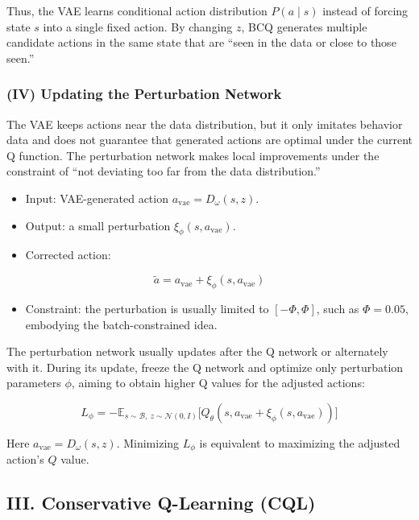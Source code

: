 Thus, the VAE learns conditional action distribution \(P(a\mid s)\) instead of forcing state \(s\) into a single fixed action. By changing \(z\), BCQ generates multiple candidate actions in the same state that are ``seen in the data or close to those seen.''

\hypertarget{iv-updating-the-perturbation-network}{%
\subsubsection{(IV) Updating the Perturbation Network}\label{iv-updating-the-perturbation-network}}

The VAE keeps actions near the data distribution, but it only imitates behavior data and does not guarantee that generated actions are optimal under the current Q function. The perturbation network makes local improvements under the constraint of ``not deviating too far from the data distribution.''

\begin{itemize}
\tightlist
\item
  Input: VAE-generated action \(a_{\mathrm{vae}}=D_\omega(s,z)\).
\item
  Output: a small perturbation \(\xi_\phi(s,a_{\mathrm{vae}})\).
\item
{}
  Corrected action:
\end{itemize}

\[
\tilde a = a_{\mathrm{vae}}+\xi_\phi(s,a_{\mathrm{vae}})
\]

\begin{itemize}
\tightlist
\item
  Constraint: the perturbation is usually limited to \([-\Phi,\Phi]\), such as \(\Phi=0.05\), embodying the batch-constrained idea.
\end{itemize}

The perturbation network usually updates after the Q network or alternately with it. During its update, freeze the Q network and optimize only perturbation parameters \(\phi\), aiming to obtain higher Q values for the adjusted actions:

\[
L_\phi
=-\mathbb{E}_{s\sim\mathcal B,\ z\sim\mathcal{N}(0,I)}
\bigl[
Q_\theta(s,a_{\mathrm{vae}}+\xi_\phi(s,a_{\mathrm{vae}}))
\bigr]
\]

Here \(a_{\mathrm{vae}}=D_\omega(s,z)\). Minimizing \(L_\phi\) is equivalent to maximizing the adjusted action's \(Q\) value.

\hypertarget{iii.-conservative-q-learning-cql}{%
\subsection{III. Conservative Q-Learning (CQL)}\label{iii.-conservative-q-learning-cql}}

